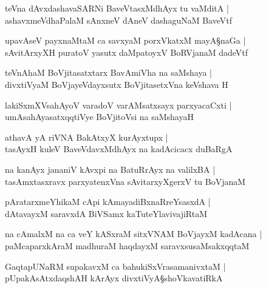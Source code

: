 \begin{shloka}
teVna dAvxdashavaSARNi BaveVtasxMdhAyx tu vaMditA |\\
ashavxmeVdhaPalaM sAnxneV dAneV dashaguNaM BaveVtf 
\end{shloka}

\begin{shloka}
upavAseV payxnaMtaM ca savxyaM porxVkatxM mayA\S naGa |\\
sAvitArxyXH puratoV yasutx daMpatoyxV BoRVjanaM dadeVtf 
\end{shloka}

\begin{shloka}
teVnAhaM BoVjitasatxtarx BavAmiVha na saMshaya |\\
divxtiVyaM BoVjayeVdayxsutx BoVjitasetxVna keVshava H 
\end{shloka}

\begin{shloka}
lakiSxmXVsahAyoV varadoV varAMsatxsayx parxyacaCxti |\\
umAsahAyasatxqqtiVye BoVjitoVsi na saMshayaH
\end{shloka}

\begin{shloka}
athavA yA riVNA BakAtxyX kurAyxtupx  |\\
tasAyxH kuleV BaveVdavxMdhAyx na kadAcicacx duBaRgA
\end{shloka}

\begin{shloka}
na kanAyx jananiV kAvxpi na BatuRrAyx na valilxBA |\\
tasAmxtasxravx parxyatenxVna sAvitarxyXgerxV tu BoVjanaM 
\end{shloka}

\begin{shloka}
pAratarxmeYhikaM cApi kAmayadiBxnaRreYsasxdA |\\
dAtavayxM saravxdA BiVSamx kaTuteYlavivajiRtaM
\end{shloka}

\begin{shloka}
na cAmalxM na ca veY kASxraM sitxVNAM BoVjayxM kadAcana |\\
paMcaparxkAraM madhuraM haqdayxM saravxsusaMsakxqqtaM 
\end{shloka}

\begin{shloka}
GaqtapUNaRM supakavxM ca bahukiSxVrasamanivxtaM |\\
pUpakAsAtxdaqshAH kArAyx divxtiVyA\S shoVkavatiRkA
\end{shloka}

